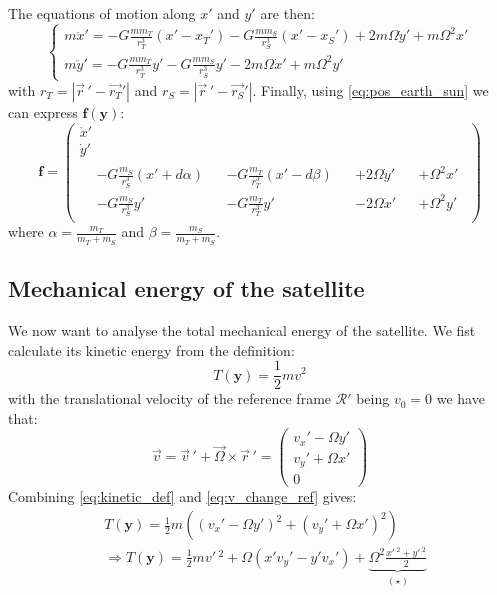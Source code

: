 The equations of motion along \(x'\) and \(y'\) are then:
\begin{equation}
    \begin{cases}
        m \ddot x' = -G \frac{m m_T}{r_T^3} (x' - x_T')
        - G \frac{m m_S}{r_S^3} (x' - x_S')
        + 2 m \Omega \dot y'
        + m \Omega^2 x' \\
        m \ddot y' = -G \frac{m m_T}{r_T^3} y'
        - G \frac{m m_S}{r_S^3} y'
        - 2 m \Omega \dot x'
        + m \Omega^2 y'
    \end{cases}
\end{equation}
with \(r_T = |\vec{r}\,' - \vec{r_T}'|\) and \(r_S = |\vec{r}\,' - \vec{r_S}'|\). Finally, using \autoref{eq:pos_earth_sun} we can express \(\mathbf f(\mathbf y)\):
\begin{equation}
    \mathbf f = \left(\begin{gathered}
        \dot x' \\
        \dot y' \\
        \begin{aligned}
            &-G \frac{m_S}{r_S^3} (x' + d \alpha) &&- G \frac{m_T}{r_T^3} (x' - d \beta) &&+ 2 \Omega \dot y' &&+ \Omega^2 x' \\
            &-G \frac{m_S}{r_S^3} y' &&-G \frac{m_T}{r_T^3} y' &&- 2 \Omega \dot x' &&+ \Omega^2 y'
        \end{aligned}
    \end{gathered}\right)
\end{equation}
where \(\alpha = \frac{m_T}{m_T + m_S}\) and \(\beta = \frac{m_S}{m_T + m_S}\).

\subsection{Mechanical energy of the satellite}
We now want to analyse the total mechanical energy of the satellite. We fist calculate its kinetic energy from the definition:
\begin{equation}
    T(\mathbf{y}) = \frac{1}{2}m v^2
    \label{eq:kinetic_def}
\end{equation}
with the translational velocity of the reference frame $\mathcal{R}'$ being $v_0 = 0$ we have that:
\begin{equation}
    \vec{v} = \vec{v}\,' + \vec{\Omega}\times\vec{r}\,' = \left(\begin{matrix} v_x' - \Omega y' \\ v_y' + \Omega x' \\ 0 \end{matrix}\right)
    \label{eq:v_change_ref}
\end{equation}
Combining \autoref{eq:kinetic_def} and \autoref{eq:v_change_ref} gives:
\begin{equation}
    \begin{aligned}
        & T(\mathbf{y}) = \frac{1}{2}m\left((v_x' - \Omega y')^2 + (v_y' + \Omega x')^2\right) \\
        & \Rightarrow T(\mathbf{y}) = \frac{1}{2}mv'\,^2 + \Omega(x'v_y' - y'v_x') + \underbrace{\Omega^2\frac{x'\,^2 + y'\,^2}{2}}_{(\star)}
    \end{aligned}
\end{equation}

